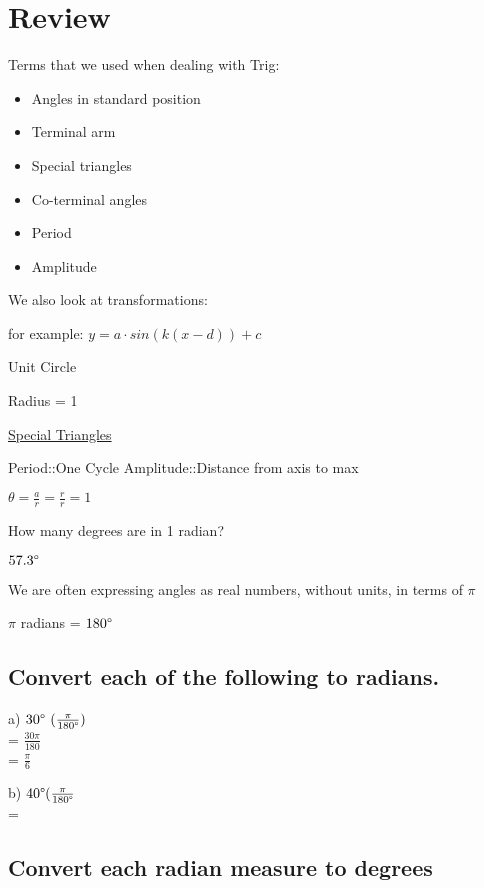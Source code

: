 \documentclass[11pt]{article}
\date{\today}
\title{}
\begin{document}
\setlength{\parindent}{0pt}

\section*{Review}
\label{sec:orgc2ee173}

Terms that we used when dealing with Trig:

\begin{itemize}
\item Angles in standard position
\item Terminal arm
\item Special triangles
\item Co-terminal angles
\item Period
\item Amplitude
\end{itemize}

We also look at transformations:

for example: \(y = a \cdot sin(k(x-d)) + c\)

Unit Circle

Radius = 1

\href{./download.jpg}{Special Triangles}

Period::One Cycle
Amplitude::Distance from axis to max

\(\theta = \frac{a}{r} = \frac{r}{r} = 1\)

How many degrees are in 1 radian?

\(57.3\degree\)

We are often expressing angles as real numbers, without units, in terms of \(\pi\)

\(\pi\) radians = \(180\degree\)

\subsection*{Convert each of the following to radians.}
\label{sec:org52e7605}

a) \(30\degree\) \((\frac{\pi}{180\degree})\)\\
= \(\frac{30\pi}{180}\)\\
= \(\frac{\pi}{6}\)

b) \(40\degree(\frac{\pi}{180\degree}\)\\
=

\subsection*{Convert each radian measure to degrees}
\label{sec:org1dd8e9b}
\end{document}
